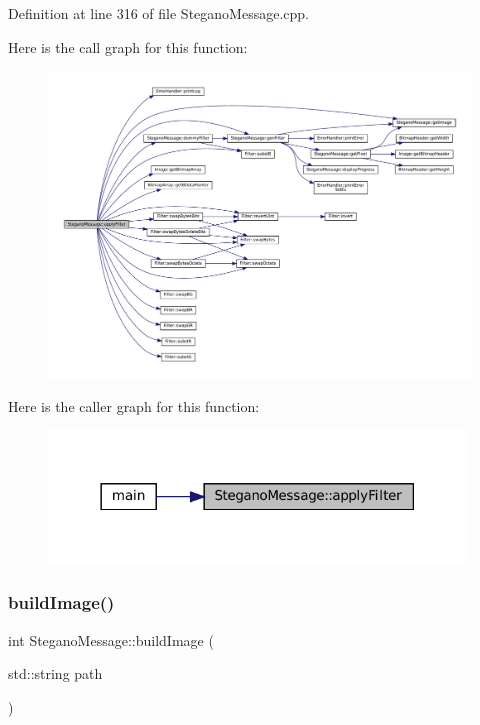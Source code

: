 Definition at line 316 of file Stegano\+Message.\+cpp.

Here is the call graph for this function\+:\nopagebreak
\begin{figure}[H]
\begin{center}
\leavevmode
\includegraphics[width=350pt]{classSteganoMessage_aec575d6949cf2eb49adefe2f1299d075_cgraph}
\end{center}
\end{figure}
Here is the caller graph for this function\+:\nopagebreak
\begin{figure}[H]
\begin{center}
\leavevmode
\includegraphics[width=314pt]{classSteganoMessage_aec575d6949cf2eb49adefe2f1299d075_icgraph}
\end{center}
\end{figure}
\mbox{\label{classSteganoMessage_ad90a4cf8cf03febfb4c3df955ccab13d}} 
\subsubsection{\texorpdfstring{buildImage()}{buildImage()}}
{\footnotesize\ttfamily int Stegano\+Message\+::build\+Image (\begin{DoxyParamCaption}\item[{std\+::string}]{path }\end{DoxyParamCaption})}



